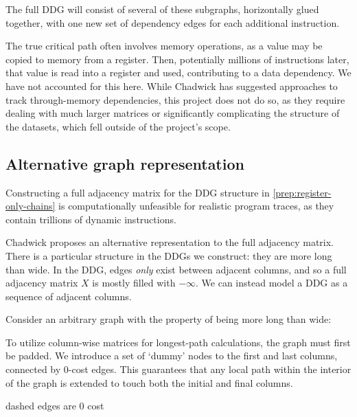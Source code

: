 The full DDG will consist of several of these subgraphs, horizontally glued together, with one new set of dependency edges 
for each additional instruction.

The true critical path often involves memory operations, as a value may be copied to memory from a register. Then,
potentially millions of instructions later, that value is read into a register and used, contributing to a data dependency.
We have not accounted for this here. While Chadwick \cite{Chadderz} has suggested approaches to track through-memory
dependencies, this project does not do so, as they require dealing with much larger matrices or significantly complicating 
the structure of the datasets, which fell outside of the project's scope.

\subsection{Alternative graph representation} \label{prep:alternative-matrix-struct}

Constructing a full adjacency matrix for the DDG structure in \ref{prep:register-only-chains}
is computationally unfeasible for realistic program traces, as they contain trillions of dynamic instructions. 

Chadwick \cite{Chadderz} proposes an alternative representation to the full adjacency matrix.
There is a particular structure in the DDGs we construct: they are more long than wide.
In the DDG, edges \textit{only} exist between adjacent columns, and so a full adjacency matrix $X$ is mostly filled
with $-\infty$. We can instead model a DDG as a sequence of adjacent columns. 

Consider an arbitrary graph with the property of being more long than wide:

\begin{center}
  
\end{center}

To utilize column-wise matrices for longest-path calculations, the graph must first be padded. We introduce a set of 
`dummy' nodes to the first and last columns, connected by 0-cost edges. This guarantees that any local path within the 
interior of the graph is extended to touch both the initial and final columns.

\begin{center}
  

{\tiny dashed edges are 0 cost}
\end{center}

